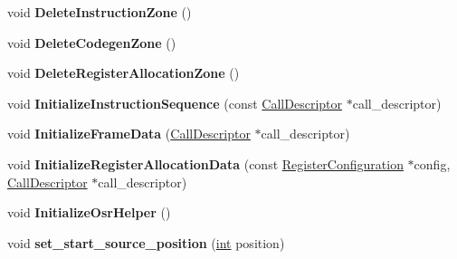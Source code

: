 \begin{DoxyCompactItemize}
void {\bfseries Delete\+Instruction\+Zone} ()
\item 
\mbox{\label{classv8_1_1internal_1_1compiler_1_1PipelineData_a6c2b47f4c9594e738e91b2e9f75907b4}} 
void {\bfseries Delete\+Codegen\+Zone} ()
\item 
\mbox{\label{classv8_1_1internal_1_1compiler_1_1PipelineData_ab895056e988516e0b6cbb16a3b37dfc3}} 
void {\bfseries Delete\+Register\+Allocation\+Zone} ()
\item 
\mbox{\label{classv8_1_1internal_1_1compiler_1_1PipelineData_a1823b93fde0d031066bf1c9104d400ff}} 
void {\bfseries Initialize\+Instruction\+Sequence} (const \mbox{\hyperlink{classv8_1_1internal_1_1compiler_1_1CallDescriptor}{Call\+Descriptor}} $\ast$call\+\_\+descriptor)
\item 
\mbox{\label{classv8_1_1internal_1_1compiler_1_1PipelineData_a1962515ca5ae07029cc89105d81413d6}} 
void {\bfseries Initialize\+Frame\+Data} (\mbox{\hyperlink{classv8_1_1internal_1_1compiler_1_1CallDescriptor}{Call\+Descriptor}} $\ast$call\+\_\+descriptor)
\item 
\mbox{\label{classv8_1_1internal_1_1compiler_1_1PipelineData_a2d68710dc4c233cf66c6cec69fdeac85}} 
void {\bfseries Initialize\+Register\+Allocation\+Data} (const \mbox{\hyperlink{classv8_1_1internal_1_1RegisterConfiguration}{Register\+Configuration}} $\ast$config, \mbox{\hyperlink{classv8_1_1internal_1_1compiler_1_1CallDescriptor}{Call\+Descriptor}} $\ast$call\+\_\+descriptor)
\item 
\mbox{\label{classv8_1_1internal_1_1compiler_1_1PipelineData_ad544151bed41f906c2b63beba487e046}} 
void {\bfseries Initialize\+Osr\+Helper} ()
\item 
\mbox{\label{classv8_1_1internal_1_1compiler_1_1PipelineData_a69bc8b9b00332940e29437258bf439c4}} 
void {\bfseries set\+\_\+start\+\_\+source\+\_\+position} (\mbox{\hyperlink{classint}{int}} position)
\item 

\end{DoxyCompactItemize}
